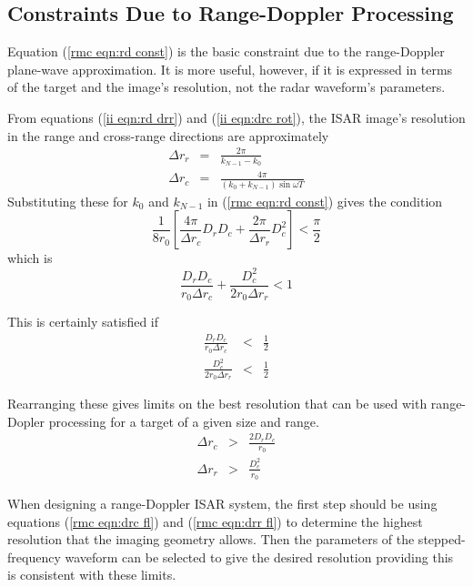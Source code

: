 \subsection{Constraints Due to Range-Doppler Processing}

Equation (\ref{rmc eqn:rd const}) is the basic constraint due to the
range-Doppler plane-wave approximation.  It is more useful, however, if it is
expressed in terms of the target and the image's resolution, not the radar
waveform's parameters.

From equations (\ref{ii eqn:rd drr}) and (\ref{ii eqn:drc rot}),
the ISAR image's resolution in the range and cross-range directions are
approximately
\begin{eqnarray}
\Delta r_r&=&\frac{2\pi}{k_{N-1}-k_0}\\
\Delta r_c&=&\frac{4\pi}{(k_0+k_{N-1})\sin\omega T}
\end{eqnarray}
Substituting these for $k_0$ and $k_{N-1}$ in (\ref{rmc eqn:rd const})
gives the condition
\begin{equation}
\frac{1}{8r_0}\left[\frac{4\pi}{\Delta r_c}D_rD_c+
\frac{2\pi}{\Delta r_r}D_c^2\right]<\frac{\pi}{2}
\end{equation}
which is
\begin{equation}
\frac{D_rD_c}{r_0\Delta r_c}+
\frac{D_c^2}{2r_0\Delta r_r}<1
\end{equation}

This is certainly satisfied if
\begin{eqnarray}
\frac{D_rD_c}{r_0\Delta r_c}&<&\frac{1}{2}\\
\frac{D_c^2}{2r_0\Delta r_r}&<&\frac{1}{2}
\end{eqnarray}

Rearranging these gives limits on the best resolution that can be used with
range-Dopler processing for a target of a given size and range.
\begin{eqnarray}
\Delta r_c&>&\frac{2D_rD_c}{r_0}		\label{rmc eqn:drc fl}\\
\Delta r_r&>&\frac{D_c^2}{r_0}			\label{rmc eqn:drr fl}
\end{eqnarray}

When designing a range-Doppler ISAR system, the first step should be using
equations (\ref{rmc eqn:drc fl}) and (\ref{rmc eqn:drr fl}) to determine the
highest resolution that the imaging geometry allows.  Then the parameters of
the stepped-frequency waveform can be selected to give the desired
resolution providing this is consistent with these limits.

